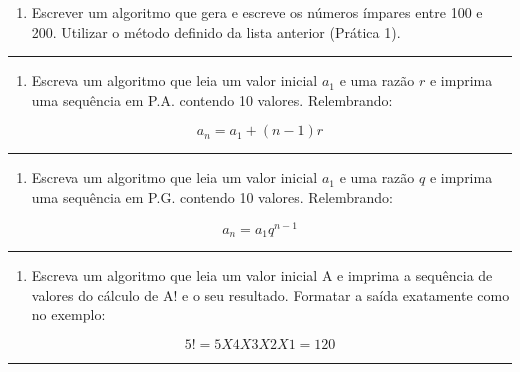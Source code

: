 \documentclass[12pt,a4paper]{article}
\renewcommand{\linethickness}{0.05em}
\providecommand{\tightlist}{%
      \setlength{\itemsep}{0pt}\setlength{\parskip}{0pt}}
\begin{document}
\begin{enumerate}
\def\labelenumi{\arabic{enumi}.}
\setcounter{enumi}{2}
\tightlist
\item
  Escrever um algoritmo que gera e escreve os números ímpares entre 100
  e 200. Utilizar o método definido da lista anterior (Prática 1).
\end{enumerate}

    \begin{center}\rule{0.5\linewidth}{\linethickness}\end{center}

\begin{enumerate}
\def\labelenumi{\arabic{enumi}.}
\setcounter{enumi}{3}
\tightlist
\item
  Escreva um algoritmo que leia um valor inicial \(a_1\) e uma razão
  \(r\) e imprima uma sequência em P.A. contendo 10 valores.
  Relembrando:
\end{enumerate}

\[a_n = a_1 + (n-1)r\]

    \begin{center}\rule{0.5\linewidth}{\linethickness}\end{center}

\begin{enumerate}
\def\labelenumi{\arabic{enumi}.}
\setcounter{enumi}{4}
\tightlist
\item
  Escreva um algoritmo que leia um valor inicial \(a_1\) e uma razão
  \(q\) e imprima uma sequência em P.G. contendo 10 valores.
  Relembrando:
\end{enumerate}

\[a_n = a_1q^{n-1}\]

    \begin{center}\rule{0.5\linewidth}{\linethickness}\end{center}

\begin{enumerate}
\def\labelenumi{\arabic{enumi}.}
\setcounter{enumi}{5}
\tightlist
\item
  Escreva um algoritmo que leia um valor inicial A e imprima a sequência
  de valores do cálculo de A! e o seu resultado. Formatar a saída
  exatamente como no exemplo:
\end{enumerate}

\[5! = 5 X 4 X 3 X 2 X 1 = 120\]

    \begin{center}\rule{0.5\linewidth}{\linethickness}\end{center}
\end{document}
